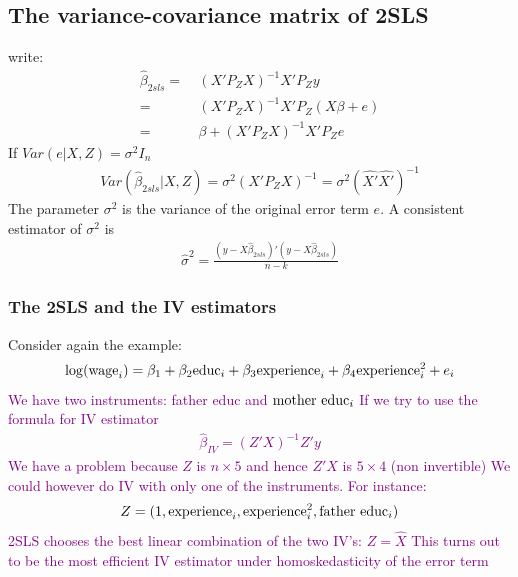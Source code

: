 \documentclass[a4paper,twoside,11pt]{article}
\begin{document}
\subsection{The variance-covariance matrix of 2SLS}
write:
\begin{equation*}
\begin{aligned}
\hat{\beta}_{2sls} =& \ (X'P_ZX)^{-1} X'P_Z y\\
=& \ (X'P_Z X)^{-1} X'P_Z (X\beta+e) \\
=& \ \beta + (X' P_Z X)^{-1} X'P_Z e
\end{aligned} 
\end{equation*}
If $Var(e|X,Z)=\sigma^2 I_n$
\begin{equation*}
\begin{aligned}
Var(\hat{\beta}_{2sls}|X,Z) = \sigma^2 (X' P_ZX)^{-1}= \sigma^2 (\hat{X'} \hat{X'})^{-1}
\end{aligned} 
\end{equation*}
The parameter $\sigma^2$ is the variance of the original error term $e$. 
\newline
\newline
A consistent estimator of $\sigma^2$ is
\begin{equation*}
\begin{aligned}
\hat{\sigma}^2 = \frac{(y- X \hat{\beta}_{2sls})'(y-X\hat{\beta}_{2sls})}{n-k}
\end{aligned} 
\end{equation*}
\subsubsection{The 2SLS and the IV estimators}
Consider again the example:
\textcolor{Purple}{
\begin{equation*}
\begin{aligned}
\log (\textmd{wage}_i)= \beta_1 + \beta_2 \textmd{educ}_i + \beta_3 \textmd{experience}_i + \beta_4 \textmd{experience}_i^2 + e_i
\end{aligned} 
\end{equation*}
We have two instruments: \textmd{father educ} and $\textmd{mother educ}_i$
\newline
\newline
\textmd{If we try to use the formula for IV estimator}
\begin{equation*}
\begin{aligned}
\hat{\beta}_{IV} = (Z'X)^{-1} Z'y
\end{aligned} 
\end{equation*}
We have a problem because $Z$ is $n \times 5$ and hence $Z'X$ is $5 \times 4$ (non invertible) 
\newline
\newline
We could however do IV with only one of the instruments. For instance:
\begin{equation*}
\begin{aligned}
Z = (1, \textmd{experience}_i , \textmd{experience}_i^2 , \textmd{father educ}_i)
\end{aligned} 
\end{equation*}
2SLS chooses the best linear combination of the two IV's: $Z = \hat{X}$
\newline
This turns out to be the most efficient IV estimator under homoskedasticity of the error term}
\end{document}
